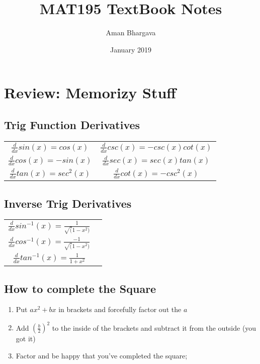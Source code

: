 \documentclass[a4paper,12pt]{report}
\begin{document}
\title{MAT195 TextBook Notes}
\author{Aman Bhargava}
\date{January 2019}
\maketitle

\tableofcontents

\section{Review: Memorizy Stuff}
\subsection{Trig Function Derivatives}
\def\arraystretch{2}%
\begin{tabular}{cc}
$ \frac{d}{dx}sin(x) = cos(x) $ & $ \frac{d}{dx}csc(x) = -csc(x)cot(x) $ \\
$ \frac{d}{dx}cos(x) = -sin(x) $ & $ \frac{d}{dx}sec(x) = sec(x)tan(x) $ \\
$ \frac{d}{dx}tan(x) = sec^2(x) $ & $ \frac{d}{dx}cot(x) = -csc^2(x) $ \\
\end{tabular}

\subsection{Inverse Trig Derivatives}
\def\arraystretch{2}%
\begin{tabular}{cc}
$ \frac{d}{dx}sin^{-1}(x) = \frac{1}{\sqrt(1-x^2)} $ \\
$ \frac{d}{dx}cos^{-1}(x) = \frac{-1}{\sqrt(1-x^2)} $ \\
$ \frac{d}{dx}tan^{-1}(x) = \frac{1}{1+x^2} $ \\
\end{tabular}

\subsection{How to complete the Square}
\begin{enumerate}
\item Put $ax^2 + bx$ in brackets and forcefully factor out the $a$
\item Add $ ( \frac{b}{2})^2$ to the inside of the brackets and subtract it from the outside (you got it)
\item Factor and be happy that you've completed the square;
\end{enumerate}
\end{document}
